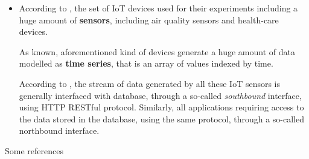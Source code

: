 \documentclass[10pt]{beamer}
\begin{document}
\begin{frame}{}
\begin{itemize}

\item According to \citet{ITPAReport}, the set of IoT devices used for their experiments including a huge amount of \textbf{sensors}, including air quality sensors and health-care devices. 

As known, aforementioned kind of devices generate a huge amount of data modelled as \textbf{time series}, that is an array of values indexed by time. 

According to \citet{TIMESERIES}, the stream of data generated by all these IoT sensors is generally interfaced with database, through a so-called \textit{southbound} interface, using HTTP RESTful protocol. Similarly, all applications requiring access to the data stored in the database, using the same protocol, through a so-called northbound interface. 

\end{itemize}
\end{frame} 









\begin{frame}[noframenumbering,shrink=15]{Some references}
\printbibliography
\end{frame}
\end{document}
